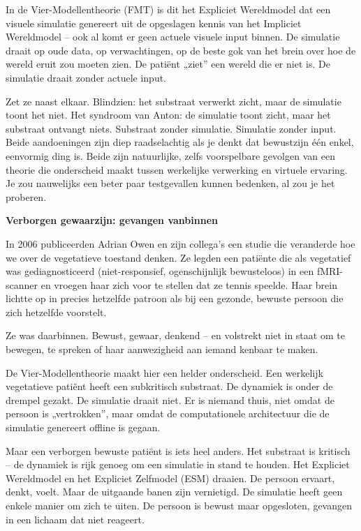 \documentclass[11pt, twoside, openright]{book}
\begin{document}
In de Vier-Modellentheorie (FMT) is dit het Expliciet Wereldmodel dat een visuele simulatie genereert uit de opgeslagen kennis van het Impliciet Wereldmodel -- ook al komt er geen actuele visuele input binnen. De simulatie draait op oude data, op verwachtingen, op de beste gok van het brein over hoe de wereld eruit zou moeten zien. De patiënt „ziet” een wereld die er niet is. De simulatie draait zonder actuele input.

Zet ze naast elkaar. Blindzien: het substraat verwerkt zicht, maar de simulatie toont het niet. Het syndroom van Anton: de simulatie toont zicht, maar het substraat ontvangt niets. Substraat zonder simulatie. Simulatie zonder input. Beide aandoeningen zijn diep raadselachtig als je denkt dat bewustzijn één enkel, eenvormig ding is. Beide zijn natuurlijke, zelfs voorspelbare gevolgen van een theorie die onderscheid maakt tussen werkelijke verwerking en virtuele ervaring. Je zou nauwelijks een beter paar testgevallen kunnen bedenken, al zou je het proberen.

\textbf{Verborgen gewaarzijn: gevangen vanbinnen}

In 2006 publiceerden Adrian Owen en zijn collega's een studie die veranderde hoe we over de vegetatieve toestand denken. Ze legden een patiënte die als vegetatief was gediagnosticeerd (niet-responsief, ogenschijnlijk bewusteloos) in een fMRI-scanner en vroegen haar zich voor te stellen dat ze tennis speelde. Haar brein lichtte op in precies hetzelfde patroon als bij een gezonde, bewuste persoon die zich hetzelfde voorstelt.

Ze was daarbinnen. Bewust, gewaar, denkend -- en volstrekt niet in staat om te bewegen, te spreken of haar aanwezigheid aan iemand kenbaar te maken.

De Vier-Modellentheorie maakt hier een helder onderscheid. Een werkelijk vegetatieve patiënt heeft een subkritisch substraat. De dynamiek is onder de drempel gezakt. De simulatie draait niet. Er is niemand thuis, niet omdat de persoon is „vertrokken”, maar omdat de computationele architectuur die de simulatie genereert offline is gegaan.

Maar een verborgen bewuste patiënt is iets heel anders. Het substraat is kritisch -- de dynamiek is rijk genoeg om een simulatie in stand te houden. Het Expliciet Wereldmodel en het Expliciet Zelfmodel (ESM) draaien. De persoon ervaart, denkt, voelt. Maar de uitgaande banen zijn vernietigd. De simulatie heeft geen enkele manier om zich te uiten. De persoon is bewust maar opgesloten, gevangen in een lichaam dat niet reageert.
\end{document}
